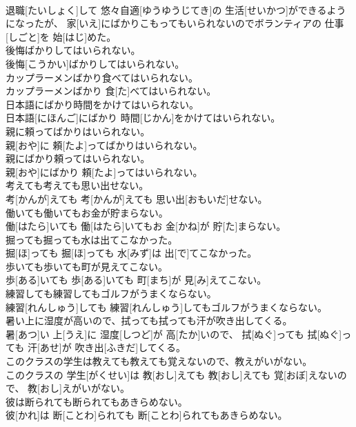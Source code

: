 \documentclass[8pt]{extreport}
\begin{document}
\begin{CJK}{UTF8}{min}
\\	退職[たいしょく]して 悠々自適[ゆうゆうじてき]の 生活[せいかつ]ができるようになったが、 家[いえ]にばかりこもってもいられないのでボランティアの 仕事[しごと]を 始[はじ]めた。
\\	後悔ばかりしてはいられない。	
\\	後悔[こうかい]ばかりしてはいられない。
\\	カップラーメンばかり食べてはいられない。	
\\	カップラーメンばかり 食[た]べてはいられない。
\\	日本語にばかり時間をかけてはいられない。	
\\	日本語[にほんご]にばかり 時間[じかん]をかけてはいられない。
\\	親に頼ってばかりはいられない。	
\\	親[おや]に 頼[たよ]ってばかりはいられない。
\\	親にばかり頼ってはいられない。	
\\	親[おや]にばかり 頼[たよ]ってはいられない。
\\	考えても考えても思い出せない。	
\\	考[かんが]えても 考[かんが]えても 思い出[おもいだ]せない。
\\	働いても働いてもお金が貯まらない。	
\\	働[はたら]いても 働[はたら]いてもお 金[かね]が 貯[た]まらない。
\\	掘っても掘っても水は出てこなかった。	
\\	掘[ほ]っても 掘[ほ]っても 水[みず]は 出[で]てこなかった。
\\	歩いても歩いても町が見えてこない。	
\\	歩[ある]いても 歩[ある]いても 町[まち]が 見[み]えてこない。
\\	練習しても練習してもゴルフがうまくならない。	
\\	練習[れんしゅう]しても 練習[れんしゅう]してもゴルフがうまくならない。
\\	暑い上に湿度が高いので、拭っても拭っても汗が吹き出してくる。	
\\	暑[あつ]い 上[うえ]に 湿度[しつど]が 高[たか]いので、 拭[ぬぐ]っても 拭[ぬぐ]っても 汗[あせ]が 吹き出[ふきだ]してくる。
\\	このクラスの学生は教えても教えても覚えないので、教えがいがない。	
\\	このクラスの 学生[がくせい]は 教[おし]えても 教[おし]えても 覚[おぼ]えないので、 教[おし]えがいがない。
\\	彼は断られても断られてもあきらめない。	
\\	彼[かれ]は 断[ことわ]られても 断[ことわ]られてもあきらめない。

\end{CJK}
\end{document}
